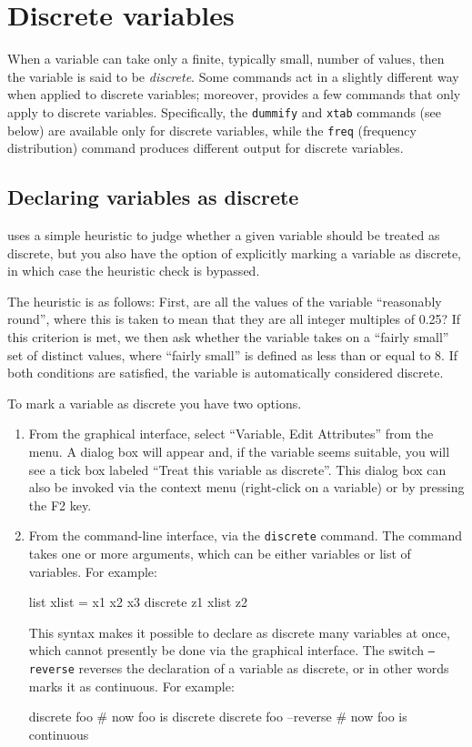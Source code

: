 \chapter{Discrete variables}
\label{chap:discrete}

When a variable can take only a finite, typically small, number of
values, then the variable is said to be \emph{discrete}. Some
 commands act in a slightly different way when applied to
discrete variables; moreover,  provides a few commands that
only apply to discrete variables.  Specifically, the \texttt{dummify}
and \texttt{xtab} commands (see below) are available only for discrete
variables, while the \texttt{freq} (frequency distribution) command
produces different output for discrete variables.


\section{Declaring variables as discrete}
\label{discr-declare}

 uses a simple heuristic to judge whether a given variable
should be treated as discrete, but you also have the option of
explicitly marking a variable as discrete, in which case the heuristic
check is bypassed.

The heuristic is as follows: First, are all the values of the variable
``reasonably round'', where this is taken to mean that they are all
integer multiples of 0.25?  If this criterion is met, we then ask
whether the variable takes on a ``fairly small'' set of distinct
values, where ``fairly small'' is defined as less than or equal to 8.
If both conditions are satisfied, the variable is automatically
considered discrete.

To mark a variable as discrete you have two options.
\begin{enumerate}
\item From the graphical interface, select ``Variable, Edit
  Attributes'' from the menu. A dialog box will appear and, if the
  variable seems suitable, you will see a tick box labeled ``Treat
  this variable as discrete''.  This dialog box can also be invoked
  via the context menu (right-click on a variable) or by pressing the
  F2 key.
\item From the command-line interface, via the \texttt{discrete}
  command. The command takes one or more arguments, which can be
  either variables or list of variables. For example:
\begin{code}
list xlist = x1 x2 x3
discrete z1 xlist z2
\end{code}
This syntax makes it possible to declare as discrete many
variables at once, which cannot presently be done via the graphical
interface. The switch \texttt{--reverse} reverses the declaration of a
variable as discrete, or in other words marks it as continuous.
For example:
\begin{code}
discrete foo
# now foo is discrete
discrete foo --reverse
# now foo is continuous
\end{code}
\end{enumerate}

